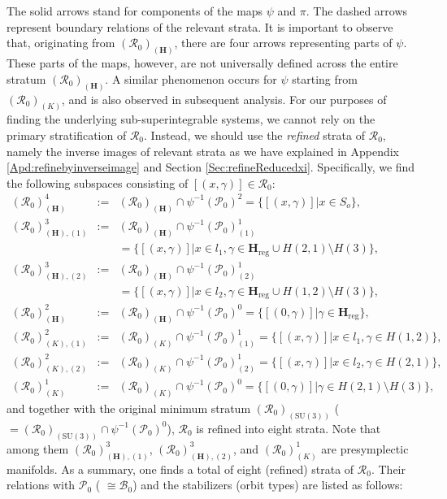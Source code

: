 \documentclass[12pt]{amsart}
\theoremstyle{definition}
\numberwithin{equation}{section}
\newcommand{\SU}{\mathrm{SU}}
\newcommand{\SET}[1]{\{#1\}}
\newcommand{\Hreg}{\Cartan_{\mathrm{reg}}}
\newcommand{\Cartan}{\mathbf{H}}
\newcommand{\Rxizero}{\mathcal{R}_{0}}
\newcommand{\Pxizero}{\mathcal{P}_{0}}
\newcommand{\Bxizero}{\mathcal{B}_{0}}
\begin{document}
The solid arrows stand for   components of the maps $\psi$ and $\pi$. The dashed arrows represent boundary relations of the relevant strata. 
 It is important to observe that, originating from $(\Rxizero)_{(\Cartan)}$, there are four arrows representing parts of $\psi$. These parts of the maps, however, are not   universally defined across the entire stratum $(\Rxizero)_{(\Cartan)}$. A similar  phenomenon occurs   for $\psi$ starting from $(\Rxizero)_{(K)}$, and is also observed  in subsequent analysis. For our purposes  of finding the  underlying sub-superintegrable systems, we cannot rely on the primary stratification of $\Rxizero$. Instead, we  should use the \emph{refined}   strata of $\Rxizero $, namely the inverse images of relevant strata as we have explained in Appendix \ref{Apd:refinebyinverseimage} and Section    \ref{Sec:refineReducedxi}. Specifically, we find the following subspaces consisting of $[(x,\gamma)]\in  \Rxizero$:
\begin{eqnarray*}
  (\Rxizero)^4_{(\Cartan)} &:=&   (\Rxizero)_{(\Cartan)}\cap \psi^{-1} (\Pxizero)^2   = \SET{[(x,\gamma)]| x\in S_o},\\
  (\Rxizero)^3_{(\Cartan),(1)} &:=&   (\Rxizero)_{(\Cartan)}\cap \psi^{-1} (\Pxizero)^1_{(1)}   \\
  &&= \SET{[(x,\gamma)]| x\in {l_1},\gamma \in \Hreg \cup H(2,1)\setminus H(3) },\\
    (\Rxizero)^3_{(\Cartan),(2)} &:=&   (\Rxizero)_{(\Cartan)}\cap \psi^{-1} (\Pxizero)^1_{(2)}   \\
  &&= \SET{[(x,\gamma)]| x\in {l_2},\gamma \in \Hreg \cup H(1,2) \setminus H(3) },\\
   (\Rxizero)^2_{(\Cartan)} &:=&   (\Rxizero)_{(\Cartan)}\cap \psi^{-1} (\Pxizero)^0  = \SET{[(0,\gamma)]| \gamma\in \Hreg},\\
 (\Rxizero)^2_{(K),(1)} &:=&   (\Rxizero)_{(K)} \cap \psi^{-1} (\Pxizero)^1_{(1)}   = \SET{[(x,\gamma)]|x\in {l_1}, \gamma\in H(1,2)},\\
 (\Rxizero)^2_{(K),(2)} &:=&   (\Rxizero)_{(K)}\cap \psi^{-1} (\Pxizero)^1_{(2)}   = \SET{[(x,\gamma)]|x\in {l_2}, \gamma\in H(2,1)},\\
 (\Rxizero)^1_{(K)} &:=&   (\Rxizero)_{(K)}\cap \psi^{-1} (\Pxizero)^0  = \SET{[(0,\gamma)]| \gamma\in H(2,1)\setminus H(3)}, 
\end{eqnarray*} 
and together with the original minimum stratum $(\Rxizero)_{(\SU(3))}$ ($=(\Rxizero)_{(\SU(3))}\cap \psi^{-1}(\Pxizero)^0  $), $\Rxizero $ is refined into eight strata. Note that among them $(\Rxizero)^3_{(\Cartan),(1)}$,   $(\Rxizero)^3_{(\Cartan),(2)}$,   and $(\Rxizero)^1_{(K)}$ are presymplectic manifolds. As a summary, one finds a total of eight (refined) strata of $\Rxizero $. Their relations with $\Pxizero $ ( $\cong \Bxizero $) and the stabilizers (orbit types) are listed as follows:
\end{document}
